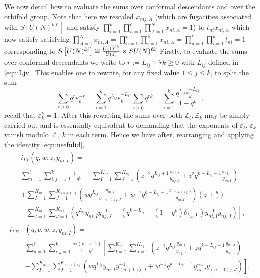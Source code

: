 \documentclass[main.tex]{subfiles}
\begin{document}
We now detail how to evaluate the sums over conformal descendants and over the orbifold group.
Note that here we rescaled $x_{mj,A}$ (which are fugacities associated with $S\left[U(N)^{k\ell}\right]$ and satisfy $\prod_{i=1}^k\prod_{n=1}^{\ell}\prod_{A=1}^Nx_{ni,A}=1$) to $t_{ni}x_{ni,A}$ which now satisfy satisfying $\prod_{A=1}^Nx_{ni,A}=\prod_{n=1}^{\ell}\prod_{i=1}^kx_{ni,A}=\prod_{n=1}^{\ell}\prod_{i=1}^kt_{ni}=1$ corresponding to $S\left[U(N)^{k\ell}\right]\cong \frac{U(1)^{\ell k}}{U(1)}\times SU(N)^{\ell k}$ 
Firstly, to evaluate the sums over conformal descendants we write to $r:=L_{ij}+\tilde{r}k\geq0$ with $L_{ij}$ defined in \eqref{eqn:Ljv}. This enables one to rewrite, for any fixed value $1\leq j\leq k$, to split the sum 
\begin{equation}
\sum_{r\geq0}q^r\varepsilon_k^{-r}=\sum_{i=1}^kq^{L_{ij}}\varepsilon_k^{-L_{ij}}\sum_{\tilde{r}\geq0}q^{\tilde{r}k}=\sum_{i=1}^k\frac{q^{L_{ij}}\varepsilon_k^{-L_{ij}}}{1-q^k}\,, 
\end{equation}
recall that $\varepsilon_k^k=1$.
After this rewriting the sums over both $\mathbb{Z}_{\ell},\mathbb{Z}_{k}$ may be simply carried out and is essentially equivalent to demanding that the exponents of $\varepsilon_{\ell}$, $\varepsilon_k$ vanish modulo $\ell$, $k$ in each term. Hence we have after, rearranging and applying the identity \eqref{eqn:usefulid},
\begin{equation}
\begin{aligned}
&i_{\Gamma V}\left(q,w,z,y_{ni,I}\right)=\\
&\sum_{n=1}^{\ell}\sum_{i,j=1}^k\frac{1}{1-q^k}\left[-\sum_{I=1}^{K_{ni}}\sum_{J=1}^{K_{nj}}\left(z^{-2}q^{L_{ij}+1}\frac{y_{ni,I}}{y_{nj,J}}+z^2q^{k-L_{ij}-1}\frac{y_{nj,J}}{y_{ni,I}}\right)\right.\\
&+\sum_{I=1}^{K_{ni}}\sum_{J=1}^{K_{(n+1)j}}\left(wq^{L_{ij}}\frac{y_{ni,I}}{y_{(n+1)j,J}}+w^{-1}q^{k-L_{ij}-1}\frac{y_{(n+1)j,J}}{y_{ni,I}}\right)\left(z+\frac{q}{z}\right)\\
&\left.-\sum_{I=1}^{K_{ni}}\sum_{J=1}^{K_{nj}}\left(q^{L_{ij}}y_{ni,I}y_{nj,J}^{-1}+\left(q^{k-L_{ij}}-(1-q^k)\delta_{L_{ni},0}\right)y_{ni,I}^{-1}y_{nj,J}\right)\right],
\end{aligned}\label{eqn:orbletterfV}
\end{equation}
\begin{equation}
\begin{aligned}
i_{\Gamma H}&\left(q,v,w,z,y_{ni,I}\right)=\\
&\sum_{n=1}^{\ell}\sum_{i,j=1}^k\frac{q^{\frac{1}{2}}\left(v+v^{-1}\right)}{1-q^k}\left[\sum_{I=1}^{K_{ni}}\sum_{J=1}^{K_{nj}}\left(z^{-1}q^{L_{ij}}\frac{y_{ni,I}}{y_{nj,J}}+zq^{k-L_{ij}-1}\frac{y_{nj,J}}{y_{ni,I}}\right)\right.\\
&\left.-\sum_{I=1}^{K_{ni}}\sum_{J=1}^{K_{(n+1)j}}\left(wq^{L_{ij}}y_{ni,I}y_{(n+1)j,J}^{-1}+w^{-1}q^{k-L_{ij}-1}y_{ni,I}^{-1}y_{(n+1)j,J}\right)\right],
\end{aligned}\label{eqn:orbletterfH}
\end{equation}
\end{document}
